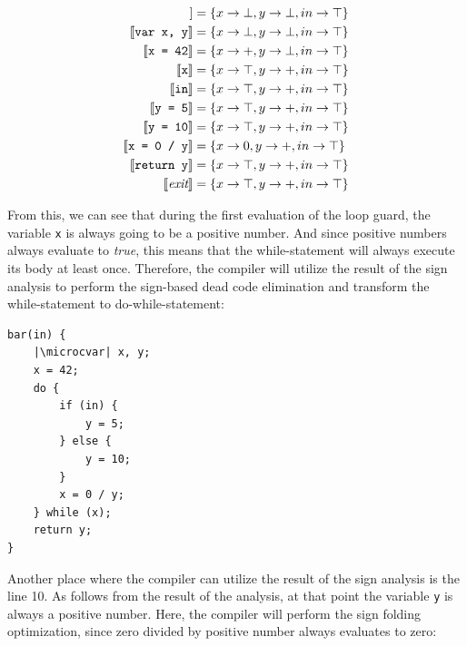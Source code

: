 \documentclass[thesis=M,english]{FITthesis}[2019/12/23]
\newcommand{\microcvar}{\textcolor{codegreen}{\textbf{var}}}
\begin{document}
\begin{align*}
    [\![ \emph{entry} ]\!] &= \{ x \rightarrow \bot, y \rightarrow \bot, in \rightarrow \top \}\\
    [\![ \texttt{var x, y} ]\!] &= \{ x \rightarrow \bot, y \rightarrow \bot, in \rightarrow \top \}\\
    [\![ \texttt{x = 42} ]\!] &= \{ x \rightarrow +, y \rightarrow \bot, in \rightarrow \top \}\\
    [\![ \texttt{x} ]\!] &= \{ x \rightarrow \top, y \rightarrow +, in \rightarrow \top \}\\
    [\![ \texttt{in} ]\!] &= \{ x \rightarrow \top, y \rightarrow +, in \rightarrow \top \}\\
    [\![ \texttt{y = 5} ]\!] &= \{ x \rightarrow \top, y \rightarrow +, in \rightarrow \top \}\\
    [\![ \texttt{y = 10} ]\!] &= \{ x \rightarrow \top, y \rightarrow +, in \rightarrow \top \}\\
    [\![ \texttt{x = 0 / y} ]\!] &= \{ x \rightarrow 0, y \rightarrow +, in \rightarrow \top \}\\
    [\![ \texttt{return y} ]\!] &= \{ x \rightarrow \top, y \rightarrow +, in \rightarrow \top \}\\
    [\![ \emph{exit} ]\!] &= \{ x \rightarrow \top, y \rightarrow +, in \rightarrow \top \}\\
\end{align*}

From this, we can see that during the first evaluation of the loop guard, the variable \texttt{x} is always going to be a positive number. And since positive numbers always evaluate to \emph{true}, this means that the while-statement will always execute its body at least once. Therefore, the compiler will utilize the result of the sign analysis to perform the sign-based dead code elimination and transform the while-statement to do-while-statement:

\begin{verbatim}
bar(in) {
	|\microcvar| x, y;
	x = 42;
	do {
		if (in) {
			y = 5;
		} else {
			y = 10;
		}
		x = 0 / y;
	} while (x);
	return y;
}
\end{verbatim}

\pagebreak

Another place where the compiler can utilize the result of the sign analysis is the line 10. As follows from the result of the analysis, at that point the variable \texttt{y} is always a positive number. Here, the compiler will perform the sign folding optimization, since zero divided by positive number always evaluates to zero:
\end{document}
